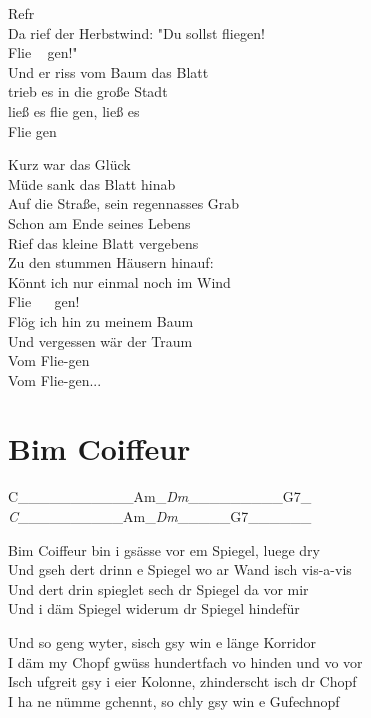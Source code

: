 \documentclass[
  letterpaper,
]{scrbook}
\begin{document}
Refr\\
Da rief der Herbstwind: "Du sollst fliegen!\\
Flie ~ gen!"\\
Und er riss vom Baum das Blatt\\
trieb es in die große Stadt\\
ließ es flie gen, ließ es\\
Flie gen

Kurz war das Glück\\
Müde sank das Blatt hinab\\
Auf die Straße, sein regennasses Grab\\
Schon am Ende seines Lebens\\
Rief das kleine Blatt vergebens\\
Zu den stummen Häusern hinauf:\\
Könnt ich nur einmal noch im Wind\\
Flie ~ ~gen!\\
Flög ich hin zu meinem Baum\\
Und vergessen wär der Traum\\
Vom Flie-gen\\
Vom Flie-gen...

\hypertarget{bim-coiffeur}{%
\chapter{Bim Coiffeur}\label{bim-coiffeur}}

\textbar C\_\_\_\_\_\_\_\textbar\_\_\_\_Am\_\emph{\textbar Dm}\_\_\_\_\_\textbar\_\_\_\_G7\_\emph{\textbar{}\\
\textbar C}\_\_\_\_\_\_\textbar\_\_\_\_Am\_\emph{\textbar Dm}\_\_\_\_\_\textbar G7\_\_\_\_\_\_\textbar{}

Bim Coiffeur bin i gsässe vor em Spiegel, luege dry\\
Und gseh dert drinn e Spiegel wo ar Wand isch vis-a-vis\\
Und dert drin spieglet sech dr Spiegel da vor mir\\
Und i däm Spiegel widerum dr Spiegel hindefür

Und so geng wyter, s\textquotesingle isch gsy win e länge Korridor\\
I däm my Chopf gwüss hundertfach vo hinden und vo vor\\
Isch ufgreit gsy i eier Kolonne, z\textquotesingle hinderscht isch dr
Chopf\\
I ha ne nümme gchennt, so chly gsy win e Gufechnopf
\end{document}
